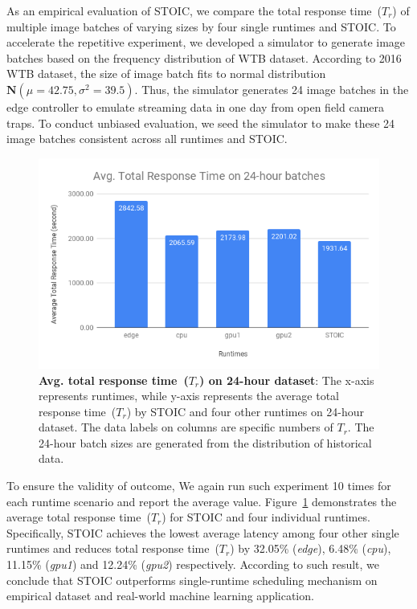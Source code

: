 %     


As an empirical evaluation of STOIC, we compare the total response time~($T_r$) of multiple image batches of varying sizes by four single runtimes and STOIC. To accelerate the repetitive experiment, we developed a simulator to generate image batches based on the frequency distribution of WTB dataset. According to 2016 WTB dataset, the size of image batch fits to normal distribution $\mathbf{N}(\mu = 42.75, \sigma^2 = 39.5)$. Thus, the simulator generates 24 image batches in the edge controller to emulate streaming data in one day from open field camera traps. To conduct unbiased evaluation, we seed the simulator to make these 24 image batches consistent across all runtimes and STOIC. 

\begin{figure}[t] \centering 
\includegraphics[scale=0.42]{figures/24-batches}
\caption{\textbf{Avg. total response time~($T_r$) on 24-hour dataset}: The x-axis represents runtimes, while y-axis represents the average total response time~($T_r$) by STOIC and four other runtimes on 24-hour dataset. The data labels on columns are specific numbers of $T_r$. The 24-hour batch sizes are generated from the distribution of historical data. 
\label{fig:24-batch}}
\end{figure}

To ensure the validity of outcome, We again run such experiment 10 times for each runtime scenario and report the average value. Figure~\ref{fig:24-batch} demonstrates the average total response time~($T_r$) for STOIC and four individual runtimes. Specifically, STOIC achieves the lowest average latency among four other single runtimes and reduces total response time~($T_r$) by 32.05\% (\textit{edge}), 6.48\% (\textit{cpu}), 11.15\% (\textit{gpu1}) and 12.24\% (\textit{gpu2}) respectively. According to such result, we conclude that STOIC outperforms single-runtime scheduling mechanism on empirical dataset and real-world machine learning application.

